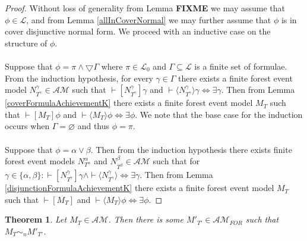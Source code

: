 \documentclass[12pt, a4paper, titlepage]{article}
\newtheorem{thm}{Theorem}[subsection]
\numberwithin{equation}{section}
\newcommand{\cover}{\bigtriangledown}
\newcommand{\sqex}[1]{[{#1}]}
\newcommand{\anex}[1]{\langle {#1} \rangle}
\newcommand{\lang}{\mathcal{L}}
\newcommand{\langProp}{\lang_0}
\newcommand{\eventClass}{\mathcal{AM}}
\newcommand{\forestClass}{\eventClass_{FOR}}
\newcommand{\FIXME}{{\bf FIXME}}
\begin{document}
\begin{proof}
Without loss of generality from Lemma {\FIXME} we may assume that $\phi \in \lang$, and from Lemma
\ref{allInCoverNormal} we may further assume that $\phi$ is in cover disjunctive normal form.
We proceed with an inductive case on the structure of $\phi$.\\
\\
Suppose that $\phi = \pi \land \cover \Gamma$ where $\pi \in \langProp$ and $\Gamma \subseteq \lang$
is a finite set of formulae.
From the induction hypothesis, for every $\gamma \in \Gamma$ there exists a finite forest event
model $N^\gamma_{T^\gamma} \in \eventClass$ such that $\vdash \sqex{N^\gamma_{T^\gamma}} \gamma$ and
$\vdash \anex{N^\gamma_{T^\gamma}} \gamma \iff \exists \gamma$.
Then from Lemma \ref{coverFormulaAchievementK} there exists a finite forest event model $M_T$ such
that $\vdash \sqex{M_T} \phi$ and $\vdash \anex{M_T} \phi \iff \exists \phi$.
We note that the base case for the induction occurs when $\Gamma = \varnothing$ and thus $\phi =
\pi$.\\
\\
Suppose that $\phi = \alpha \lor \beta$.
Then from the induction hypothesis there exists finite forest event models $N^\alpha_{T^\alpha}$ and
$N^\beta_{T^\beta} \in \eventClass$ such that for $\gamma \in \{\alpha, \beta\}:
\vdash \sqex{N^\gamma_{T^\gamma}} \gamma \land \vdash \anex{N^\gamma_{T^\gamma}} \iff \exists
\gamma$.
Then from Lemma \ref{disjunctionFormulaAchievementK} there exists a finite forest event model $M_T$ such
that $\vdash \sqex{M_T}$ and $\vdash \anex{M_T} \phi \iff \exists \phi$.
\end{proof}

\begin{thm} \label{approximatingEventModel}
Let $M_T \in \eventClass$.
Then there is some $M'_{T'} \in \forestClass$ such that $M_T \sim_n M'_{T'}$.
\end{thm}
\end{document}
